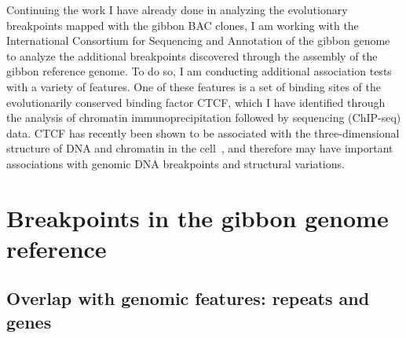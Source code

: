 Continuing the work I have already done in analyzing the evolutionary breakpoints mapped with the gibbon BAC clones, I am working with the International Consortium for Sequencing and Annotation of the gibbon genome to analyze the additional breakpoints discovered through the assembly of the gibbon reference genome. To do so, I am conducting additional association tests with a variety of features. One of these features is a set of binding sites of the evolutionarily conserved binding factor CTCF, which I have identified through the analysis of chromatin immunoprecipitation followed by sequencing (ChIP-seq) data. CTCF has recently been shown to be associated with the three-dimensional structure of DNA and chromatin in the cell~\cite{Dixon:2012gc}, and therefore may have important associations with genomic DNA breakpoints and structural variations.


\section{Breakpoints in the gibbon genome reference}

\subsection{Overlap with genomic features: repeats and genes}


